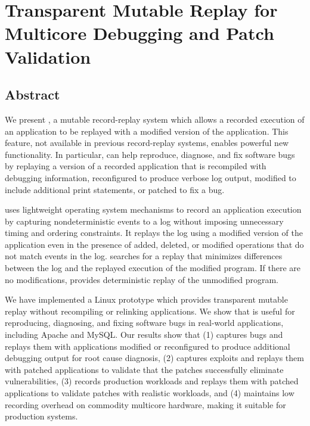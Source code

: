 \section{Transparent Mutable Replay for Multicore Debugging and Patch Validation}
\label{ch:proposal}

\subsection{Abstract}

We present {\dora}, a mutable record-replay system which allows a
recorded execution of an application to be replayed with a modified
version of the application.  This feature, not available in previous
record-replay systems, enables powerful new functionality. In particular,
{\dora} can
help reproduce, diagnose, and fix software bugs
by replaying a version of a recorded application that is
recompiled with debugging information, reconfigured to produce verbose
log output, modified to include additional print statements, or
patched to fix a bug.

{\dora} uses lightweight operating system mechanisms to record an
application execution by capturing nondeterministic events to a log
without imposing unnecessary timing and ordering constraints. It
replays the log using a modified version of the
application even in the presence of added, deleted, or modified
operations that do not match events in the log.  {\dora} searches
for a replay that minimizes differences between the log and the 
replayed execution of the modified program.  If there are no
modifications, {\dora} provides deterministic replay of the
unmodified program.

We have implemented a Linux prototype which provides
transparent mutable replay without recompiling or relinking
applications.  We show that {\dora} is useful for reproducing,
diagnosing, and fixing software bugs in real-world applications,
including Apache and MySQL\@.  Our results show that {\dora}
(1) captures bugs and replays them with applications modified or
reconfigured to produce additional debugging output for root cause
diagnosis, (2) captures exploits and replays them with patched
applications to validate that the patches successfully eliminate
vulnerabilities, (3) 
records production workloads and replays them with patched
applications to validate patches with realistic workloads, and (4)
maintains low recording overhead on commodity multicore hardware,
making it suitable for production systems.

